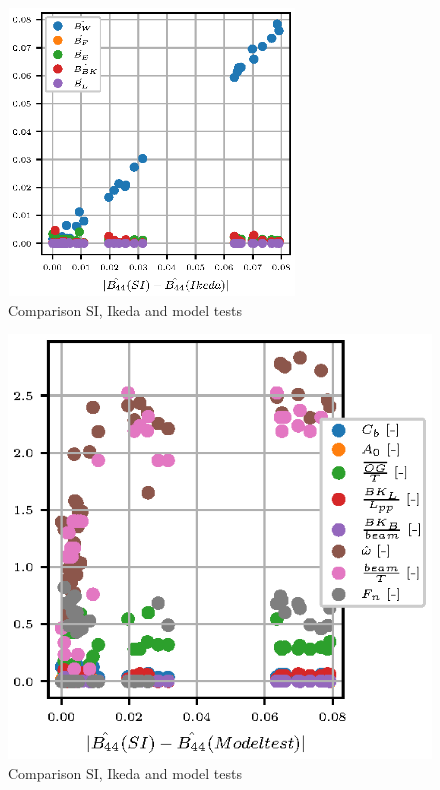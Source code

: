 \begin{figure}[H]
    \centering
    \includegraphics[width=3in, height=3in]{figures/component_residual.eps}
        \vspace{-0.5cm}
    \caption{Comparison SI, Ikeda and model tests}
    \label{fig:si_ikeda_model}
\end{figure}

\begin{figure}[H]
    \centering
    \includegraphics[]{figures/parameter_residual.eps}
        \vspace{-0.5cm}
    \caption{Comparison SI, Ikeda and model tests}
    \label{fig:si_ikeda_model}
\end{figure}

